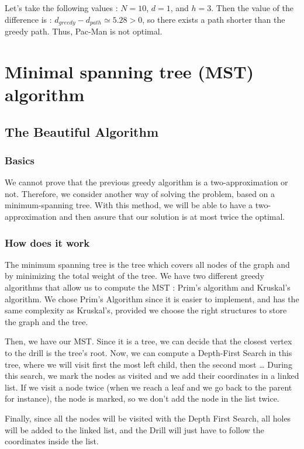 \documentclass[11pt]{article}
\begin{document}
Let's take the following values : $N = 10$, $d = 1$, and $h = 3$.
Then the value of the difference is : $d_{greedy} - d_{path} \simeq 5.28 > 0$, 
so there exists a path shorter than the greedy path.
Thus, Pac-Man is not optimal.

\section{Minimal spanning tree (MST) algorithm}

\subsection{The Beautiful Algorithm}

\subsubsection{Basics}
We cannot prove that the previous greedy algorithm is a two-approximation or not. Therefore, we consider another way of solving the problem, based on a minimum-spanning tree. With this method, we will be able to have a two-approximation and then assure that our solution is at most twice the optimal.
\subsubsection{How does it work}

The minimum spanning tree is the tree which covers all nodes of the graph and by minimizing the total weight of the tree.
We have two different greedy algorithms that allow us to compute the MST : Prim's algorithm and Kruskal's algorithm. We chose Prim's Algorithm since it is easier to implement, and has the same complexity as Kruskal's, provided we choose the right structures to store the graph and the tree.

Then, we have our MST. Since it is a tree, we can decide that the closest vertex to the drill is the tree's root.
Now, we can compute a Depth-First Search in this tree, where we will visit first the most left child, then the second most \dots 
During this search, we mark the nodes as visited and we add their coordinates in a linked list. If we visit a node twice (when we reach a leaf and we go back to the parent for instance), the node is marked, so we don't add the node in the list twice.

Finally, since all the nodes will be visited with the Depth First Search, all holes will be added to the linked list, and the Drill will just have to follow the coordinates inside the list.
\end{document}
